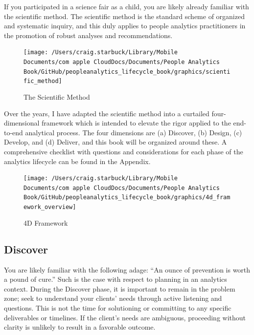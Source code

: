 \documentclass[]{book}
\begin{document}
If you participated in a science fair as a child, you are likely already familiar with the scientific method. The scientific method is the standard scheme of organized and systematic inquiry, and this duly applies to people analytics practitioners in the promotion of robust analyses and recommendations.

\begin{figure}

{\centering \texttt{[image: /Users/craig.starbuck/Library/Mobile Documents/com~apple~CloudDocs/Documents/People Analytics Book/GitHub/peopleanalytics\_lifecycle\_book/graphics/scientific\_method]} 

}

\caption{The Scientific Method}\label{fig:sci-method}
\end{figure}

Over the years, I have adapted the scientific method into a curtailed four-dimensional framework which is intended to elevate the rigor applied to the end-to-end analytical process. The four dimensions are (a) Discover, (b) Design, (c) Develop, and (d) Deliver, and this book will be organized around these. A comprehensive checklist with questions and considerations for each phase of the analytics lifecycle can be found in the Appendix.

\begin{figure}

{\centering \texttt{[image: /Users/craig.starbuck/Library/Mobile Documents/com~apple~CloudDocs/Documents/People Analytics Book/GitHub/peopleanalytics\_lifecycle\_book/graphics/4d\_framework\_overview]} 

}

\caption{4D Framework}\label{fig:4d-framework}
\end{figure}

\hypertarget{discover}{%
\subsection{Discover}\label{discover}}

You are likely familiar with the following adage: ``An ounce of prevention is worth a pound of cure.'' Such is the case with respect to planning in an analytics context. During the Discover phase, it is important to remain in the problem zone; seek to understand your clients' needs through active listening and questions. This is not the time for solutioning or committing to any specific deliverables or timelines. If the client's needs are ambiguous, proceeding without clarity is unlikely to result in a favorable outcome.
\end{document}
